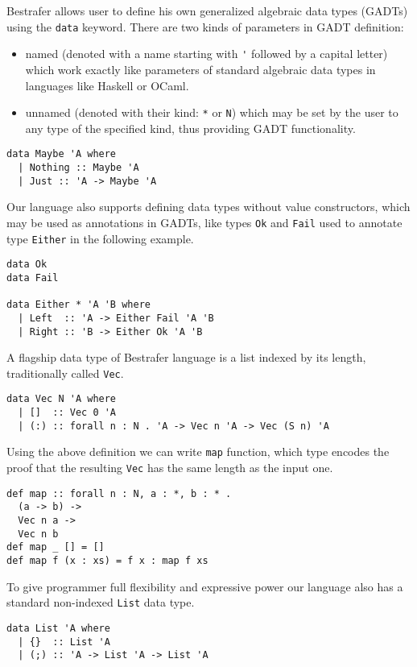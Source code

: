 \documentclass[declaration,shortabstract,english]{iithesis}
\begin{document}
Bestrafer allows user to define his own generalized algebraic data types (GADTs)
using the \verb+data+ keyword. There are two kinds of parameters in GADT definition:
\begin{itemize}
  \item named (denoted with a name starting with \verb+'+ followed by a capital letter) which work
        exactly like parameters of standard algebraic data types in languages like Haskell or OCaml.
  \item unnamed (denoted with their kind: \verb+*+ or \verb+N+) which may be set by the user to any type
        of the specified kind, thus providing GADT functionality.
\end{itemize}
\begin{verbatim}
data Maybe 'A where
  | Nothing :: Maybe 'A
  | Just :: 'A -> Maybe 'A
\end{verbatim}
Our language also supports defining data types without value constructors, which may be used as annotations in GADTs,
like types \verb+Ok+ and \verb+Fail+ used to annotate type \verb+Either+ in the following example.
\begin{verbatim}
data Ok
data Fail

data Either * 'A 'B where
  | Left  :: 'A -> Either Fail 'A 'B
  | Right :: 'B -> Either Ok 'A 'B
\end{verbatim}
A flagship data type of Bestrafer language is a list indexed by its length, traditionally called \verb+Vec+.
\begin{verbatim}
data Vec N 'A where
  | []  :: Vec 0 'A
  | (:) :: forall n : N . 'A -> Vec n 'A -> Vec (S n) 'A
\end{verbatim}
Using the above definition we can write \verb+map+ function, which type encodes the proof that the resulting \verb+Vec+ has the same
length as the input one.
\begin{verbatim}
def map :: forall n : N, a : *, b : * .
  (a -> b) ->
  Vec n a ->
  Vec n b
def map _ [] = []
def map f (x : xs) = f x : map f xs
\end{verbatim}
To give programmer full flexibility and expressive power our language also has a standard non-indexed \verb+List+ data type.
\begin{verbatim}
data List 'A where
  | {}  :: List 'A
  | (;) :: 'A -> List 'A -> List 'A
\end{verbatim}
\end{document}
